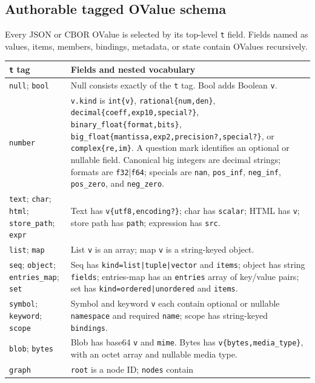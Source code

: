 \documentclass[11pt,oneside]{article}
\begin{document}
\subsection{Authorable tagged OValue schema}

Every JSON or CBOR OValue is selected by its top-level \texttt{t} field.
Fields named as values, items, members, bindings, metadata, or state contain
OValues recursively.

\begin{longtable}{P{0.22\textwidth} P{0.70\textwidth}}
\toprule
\textbf{\texttt{t} tag} & \textbf{Fields and nested vocabulary} \\
\midrule
\endhead
\texttt{null}; \texttt{bool} & Null consists exactly of the \texttt{t} tag.
Bool adds Boolean \texttt{v}. \\
\texttt{number} & \texttt{v.kind} is
\texttt{int\{v\}}, \texttt{rational\{num,den\}},
\texttt{decimal\{coeff,exp10,special?\}},
\texttt{binary\_float\{format,bits\}},
\texttt{big\_float\{mantissa,exp2,precision?,special?\}}, or
\texttt{complex\{re,im\}}. A question mark identifies an optional or nullable
field. Canonical big integers are decimal strings;
formats are \texttt{f32}|\texttt{f64}; specials are \texttt{nan},
\texttt{pos\_inf}, \texttt{neg\_inf}, \texttt{pos\_zero}, and
\texttt{neg\_zero}. \\
\texttt{text}; \texttt{char}; \texttt{html}; \texttt{store\_path};
\texttt{expr} & Text has \texttt{v\{utf8,encoding?\}}; char has
\texttt{scalar}; HTML has \texttt{v}; store path has \texttt{path}; expression
has \texttt{src}. \\
\texttt{list}; \texttt{map} & List \texttt{v} is an array; map \texttt{v} is
a string-keyed object. \\
\texttt{seq}; \texttt{object}; \texttt{entries\_map}; \texttt{set} & Seq has
\texttt{kind=list|tuple|vector} and \texttt{items}; object has string
\texttt{fields}; entries-map has an \texttt{entries} array of key/value pairs;
set has \texttt{kind=ordered|unordered} and \texttt{items}. \\
\texttt{symbol}; \texttt{keyword}; \texttt{scope} & Symbol and keyword
\texttt{v} each contain optional or nullable \texttt{namespace} and required
\texttt{name}; scope has string-keyed \texttt{bindings}. \\
\texttt{blob}; \texttt{bytes} & Blob has base64 \texttt{v} and \texttt{mime}.
Bytes has \texttt{v\{bytes,media\_type\}}, with an octet array and nullable
media type. \\
\texttt{graph} & \texttt{root} is a node ID; \texttt{nodes} contain

\end{longtable}
\end{document}
